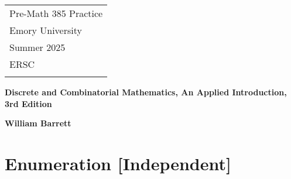 \documentclass[a4paper,12pt]{article}
\theoremstyle{definition}
\theoremstyle{remark}
\begin{document}
	\thispagestyle{empty} %
	
	\begin{tabular}{p{15.5cm}} %
		{\large \sc Pre-Math 385 Practice} \\
		Emory University \\ Summer 2025 \\ ERSC \\
		\hline %
		\\
	\end{tabular} %
	
	\vspace*{0.3cm} %
	
	\begin{center} %
		{\Large \bf Discrete and Combinatorial Mathematics, An Applied Introduction, 3rd Edition} %
		\vspace{2mm}
		
		{\bf William Barrett}\\ %
		
	\end{center}  
	
	\vspace{0.4cm}
\section{Enumeration [Independent]}
\end{document}
